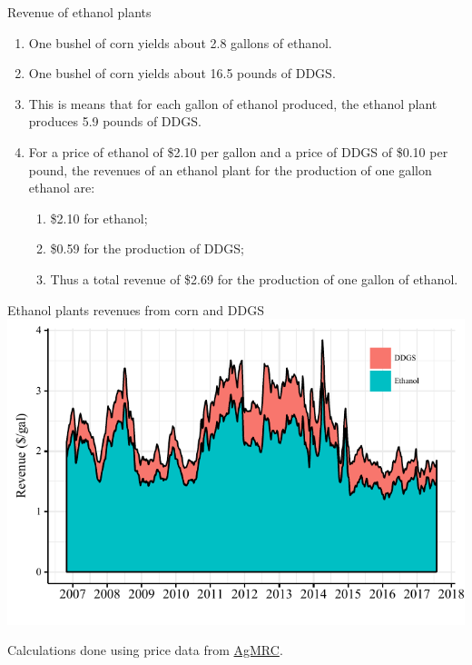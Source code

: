 \documentclass[table,xcolor=pdftex,dvipsnames]{beamer}\usepackage[]{graphicx}\usepackage[]{color}
\makeatletter
\def\maxwidth{ %
  \ifdim\Gin@nat@width>\linewidth
    \linewidth
  \else
    \Gin@nat@width
  \fi
}
\newenvironment{knitrout}{}{} %
\makeatother
\begin{document}

\begin{frame}{Revenue of ethanol plants}
\begin{enumerate}[label=\textbullet]
    \item One bushel of corn yields about 2.8 gallons of ethanol.
    \item One bushel of corn yields about 16.5 pounds of DDGS.
    \item This is means that for each gallon of ethanol produced, the ethanol plant produces 5.9 pounds of DDGS.
    \item For a price of ethanol of \$2.10 per gallon and a price of DDGS of \$0.10 per pound, the revenues of an ethanol plant for the production of one gallon ethanol are:
    \begin{enumerate}[label=-]
        \item \$2.10 for ethanol;
        \item \$0.59 for the production of DDGS;
        \item Thus a total revenue of \$2.69 for the production of one gallon of ethanol.
    \end{enumerate}
\end{enumerate}
\end{frame}


\begin{frame}{Ethanol plants revenues from corn and DDGS}
\begin{knitrout}
\color{fgcolor}
\includegraphics[width=\maxwidth]{figure/figure_rev2-1} 

\end{knitrout}
\vspace{-1\baselineskip}
\scriptsize
Calculations done using price data from \href{http://www.extension.iastate.edu/agdm/energy/xls/agmrcethanolplantprices.xlsx}{AgMRC}.
\end{frame}
\end{document}
